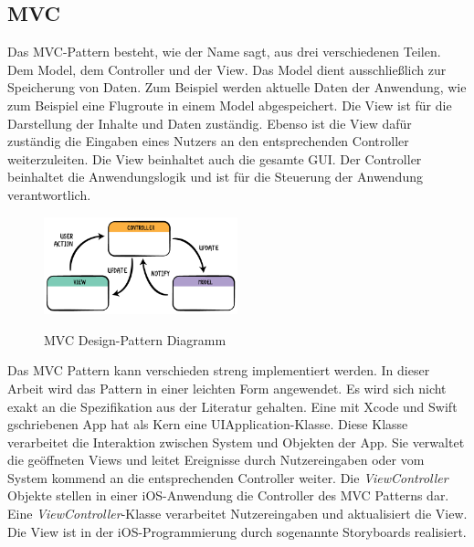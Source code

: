 \subsection{\acf{MVC}}\label{subsec:MVC}
Das \acs{MVC}-Pattern besteht, wie der Name sagt, aus drei verschiedenen Teilen. Dem Model, dem Controller und der View.
Das Model dient ausschließlich zur Speicherung von Daten. Zum Beispiel werden aktuelle Daten der Anwendung, wie zum Beispiel eine Flugroute in einem Model abgespeichert.
Die View ist für die Darstellung der Inhalte und Daten zuständig. Ebenso ist die View dafür zuständig die Eingaben eines Nutzers an den entsprechenden Controller weiterzuleiten. Die View beinhaltet auch die gesamte \acf{GUI}. 
Der Controller beinhaltet die Anwendungslogik und ist für die Steuerung der Anwendung verantwortlich.
\newline
\begin{figure}[H]
	\begin{center}
		{\includegraphics[width=0.5\textwidth]{images/diagram-mvc.png}}
		\caption{MVC Design-Pattern Diagramm \cite{MVC}}
	\end{center}
\end{figure}
Das \acs{MVC} Pattern kann verschieden streng implementiert werden. In dieser Arbeit wird das Pattern in einer leichten Form angewendet. Es wird sich nicht exakt an die Spezifikation aus der Literatur gehalten.
\newline
\newline
Eine mit Xcode und Swift gschriebenen App hat als Kern eine UIApplication-Klasse. Diese Klasse verarbeitet die Interaktion zwischen System und Objekten der App. Sie verwaltet die geöffneten Views und leitet Ereignisse durch Nutzereingaben oder vom System kommend an die entsprechenden Controller weiter. 
\newline
Die \textit{ViewController} Objekte stellen in einer iOS-Anwendung die Controller des \acs{MVC} Patterns dar. Eine \textit{ViewController}-Klasse verarbeitet Nutzereingaben und aktualisiert die View. 
\newline
Die View ist in der iOS-Programmierung durch sogenannte Storyboards realisiert. \cite{MVC} 

